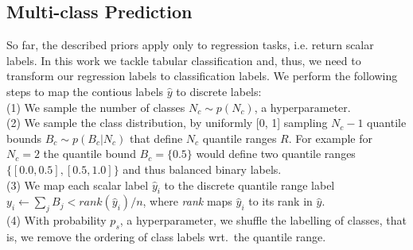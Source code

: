 \documentclass{article}
\DeclareMathOperator*{\E}{\mathbb{E}}
\begin{document}
\subsection{Multi-class Prediction}
\label{sec:multi-class prediction}
So far, the described priors apply only to regression tasks, i.e. return scalar labels. In this work we tackle tabular classification and, thus, we need to transform our regression labels to classification labels. We perform the following steps to map the contious labels $\hat{y}$ to discrete labels:\\
\hphantom{~~~~}(1) We sample the number of classes $N_c \sim p(N_c)$, a hyperparameter.\\
\hphantom{~~~~}(2) We sample the class distribution, by uniformly [0, 1] sampling $N_c-1$ quantile bounds $B_c \sim p(B_c|N_c)$ that define $N_c$ quantile ranges $R$.
For example for $N_c = 2$ the quantile bound $B_c = \{0.5\}$ would define two quantile ranges $\{[0.0, 0.5], [0.5, 1.0]\}$ and thus balanced binary labels.\\
\hphantom{~~~~}(3) We map each scalar label $\hat{y}_i$ to the discrete quantile range label $y_i \gets \sum_{j} B_j < \textit{rank}(\hat{y}_i)/n$, where \textit{rank} maps $\hat{y}_i$ to its rank in $\hat{y}$.\\
\hphantom{~~~~}(4) With probability $p_s$, a hyperparameter, we shuffle the labelling of classes, that is, we remove the ordering of class labels wrt.\ the quantile range.
\end{document}
